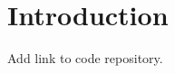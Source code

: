 \documentclass[twoside,11pt]{article}
\newcommand{\Joris}[1]{{\color{blue}#1}}
\newcommand{\Sara}[1]{{\color{purple}#1}}
\begin{document}
\section{Introduction}\label{sec:introduction}

\Joris{Add link to code repository.}

\end{document}
